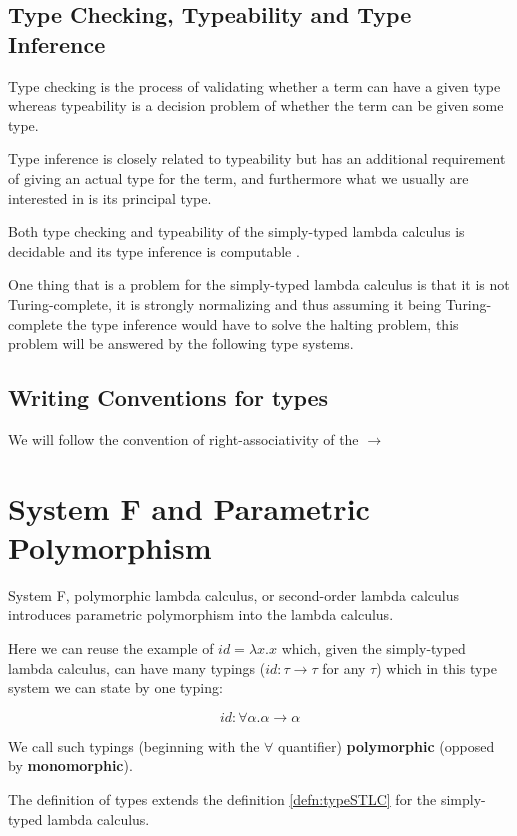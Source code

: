 \subsection{Type Checking, Typeability and Type Inference}

Type checking is the process of validating whether a term can have a given type whereas typeability is a decision problem of whether the term can be given some type.

Type inference is closely related to typeability but has an additional requirement of giving an actual type for the term, and furthermore what we usually are interested in is its principal type.

Both type checking and typeability of the simply-typed lambda calculus is decidable and its type inference is computable \cite{barendregt1992lambda}.

One thing that is a problem for the simply-typed lambda calculus is that it is not Turing-complete, it is strongly normalizing \cite{barendregt1992lambda} and thus assuming it being Turing-complete the type inference would have to solve the halting problem, this problem will be answered by the following type systems.

\subsection{Writing Conventions for types}

We will follow the convention of right-associativity of the $\rightarrow$

\section{System F and Parametric Polymorphism}

System F, polymorphic lambda calculus, or second-order lambda calculus introduces parametric polymorphism into the lambda calculus.

Here we can reuse the example of $id = \lambda x . x$ which, given the simply-typed lambda calculus, can have many typings ($id : \tau \rightarrow \tau$ for any $\tau$) which in this type system we can state by one typing:

$$id : \forall \alpha . \alpha \rightarrow \alpha$$

We call such typings (beginning with the $\forall$ quantifier) \textbf{polymorphic} (opposed by \textbf{monomorphic}).

The definition of types extends the definition \ref{defn:typeSTLC} for the simply-typed lambda calculus.


